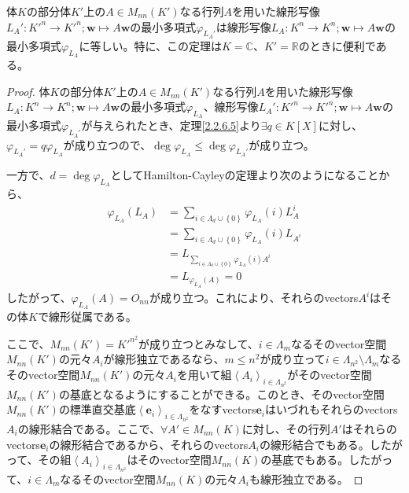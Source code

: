 \documentclass[dvipdfmx]{jsarticle}
\begin{document}
\begin{thm}\label{2.2.6.8}
体$K$の部分体$K'$上の$A \in M_{nn}\left( K' \right)$なる行列$A$を用いた線形写像$L_{A}':{K'}^{n} \rightarrow {K'}^{n};\mathbf{w} \mapsto A\mathbf{w}$の最小多項式$\varphi_{L_{A}'}$は線形写像$L_{A}:K^{n} \rightarrow K^{n};\mathbf{w} \mapsto A\mathbf{w}$の最小多項式$\varphi_{L_{A}}$に等しい。特に、この定理は$K = \mathbb{C}$、$K' = \mathbb{R}$のときに便利である。
\end{thm}
\begin{proof}
体$K$の部分体$K'$上の$A \in M_{nn}\left( K' \right)$なる行列$A$を用いた線形写像$L_{A}:K^{n} \rightarrow K^{n};\mathbf{w} \mapsto A\mathbf{w}$の最小多項式$\varphi_{L_{A}}$、線形写像$L_{A}':{K'}^{n} \rightarrow {K'}^{n};\mathbf{w} \mapsto A\mathbf{w}$の最小多項式$\varphi_{L_{A}'}$が与えられたとき、定理\ref{2.2.6.5}より$\exists q \in K[ X]$に対し、$\varphi_{L_{A}'} = q\varphi_{L_{A}}$が成り立つので、$\deg{\varphi_{L_{A}}} \leq \deg{\varphi_{L_{A}'}}$が成り立つ。\par
一方で、$d = \deg{\varphi_{L_{A}}}$としてHamilton-Cayleyの定理より次のようになることから、
\begin{align*}
\varphi_{L_{A}}\left( L_{A} \right) &= \sum_{i \in \varLambda_{d} \cup \left\{ 0 \right\}} {\varphi_{L_{A}}(i)L_{A}^{i}}\\
&= \sum_{i \in \varLambda_{d} \cup \left\{ 0 \right\}} {\varphi_{L_{A}}(i)L_{A^{i}}}\\
&= L_{\sum_{i \in \varLambda_{d} \cup \left\{ 0 \right\}} {\varphi_{L_{A}}(i)A^{i}}}\\
&= L_{\varphi_{L_{A}}(A)} = 0
\end{align*}
したがって、$\varphi_{L_{A}}(A) = O_{nn}$が成り立つ。これにより、それらのvectors$A^{i}$はその体$K$で線形従属である。\par
ここで、$M_{nn}\left( K' \right) = {K'}^{n^{2}}$が成り立つとみなして、$i \in \varLambda_{m}$なるそのvector空間$M_{nn}\left( K' \right)$の元々$A_{i}$が線形独立であるなら、$m \leq n^{2}$が成り立って$i \in \varLambda_{n^{2}} \setminus \varLambda_{m}$なるそのvector空間$M_{nn}\left( K' \right)$の元々$A_{i}$を用いて組$\left\langle A_{i} \right\rangle_{i \in \varLambda_{n^{2}}}$がそのvector空間$M_{nn}\left( K' \right)$の基底となるようにすることができる。このとき、そのvector空間$M_{nn}\left( K' \right)$の標準直交基底$\left\langle \mathbf{e}_{i} \right\rangle_{i \in \varLambda_{n^{2}}}$をなすvectors$\mathbf{e}_{i}$はいづれもそれらのvectors$A_{i}$の線形結合である。ここで、$\forall A' \in M_{nn}(K)$に対し、その行列$A'$はそれらのvectors$\mathbf{e}_{i}$の線形結合であるから、それらのvectors$A_{i}$の線形結合でもある。したがって、その組$\left\langle A_{i} \right\rangle_{i \in \varLambda_{n^{2}}}$はそのvector空間$M_{nn}(K)$の基底でもある。したがって、$i \in \varLambda_{m}$なるそのvector空間$M_{nn}(K)$の元々$A_{i}$も線形独立である。\par

\end{proof}
\end{document}
